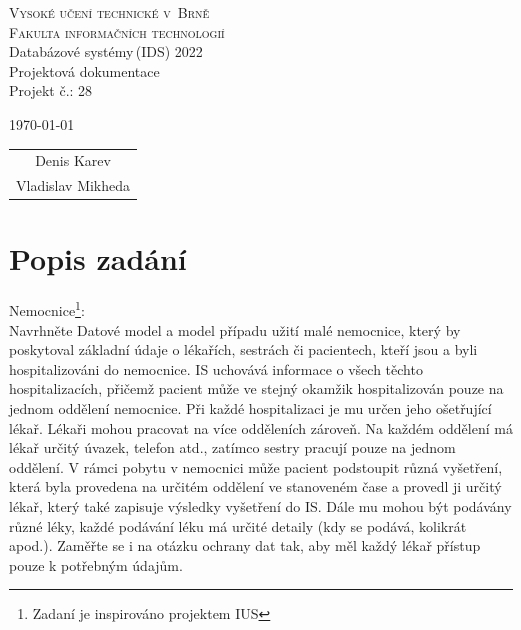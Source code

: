 \documentclass[a4paper,11pt]{article}
\begin{document}
\begin{titlepage}
    \begin{center}
        \Huge
        \textsc{Vysoké učení technické v~Brně\\
               \huge Fakulta informačních technologií}\\
               
        \LARGE
                Databázové systémy\,(IDS) 2022\\
                \Huge Projektová dokumentace\\
                 Projekt č.: 28\\
    \end{center}
    
    {\Large \today \hfill
                \begin{tabular}{c}
                Denis Karev\\
                Vladislav Mikheda\\
                \end{tabular}
                }
\end{titlepage}

\begin{center}
{\hypersetup{hidelinks}\tableofcontents}
\end{center}
\newpage

\section{Popis zadání}
Nemocnice\footnote{Zadaní je inspirováno projektem IUS}:\\
Navrhněte Datové model a model případu užití malé nemocnice, který by poskytoval základní údaje o lékařích, sestrách či pacientech, kteří jsou a byli hospitalizováni do nemocnice. IS uchovává informace o všech těchto hospitalizacích, přičemž pacient může ve stejný okamžik hospitalizován pouze na jednom oddělení nemocnice. Při každé hospitalizaci je mu určen jeho ošetřující lékař. Lékaři mohou pracovat na více odděleních zároveň. Na každém oddělení má lékař určitý úvazek, telefon atd., zatímco sestry pracují pouze na jednom oddělení. V rámci pobytu v nemocnici může pacient podstoupit různá vyšetření, která byla provedena na určitém oddělení ve stanoveném čase a provedl ji určitý lékař, který také zapisuje výsledky vyšetření do IS. Dále mu mohou být podávány různé léky, každé podávání léku má určité detaily (kdy se podává, kolikrát apod.).
Zaměřte se i na otázku ochrany dat tak, aby měl každý lékař přístup pouze k potřebným údajům.
\newpage
\end{document}
